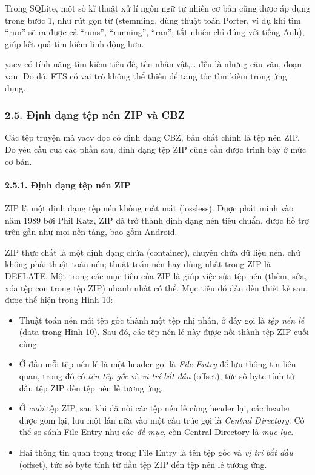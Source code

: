 \documentclass[
]{article}
\begin{document}
Trong SQLite, một số kĩ thuật xử lí ngôn ngữ tự nhiên cơ bản cũng được
áp dụng trong bước 1, như rút gọn từ (stemming, dùng thuật toán Porter,
ví dụ khi tìm ``run'' sẽ ra được cả ``runs'', ``running'', ``ran''; tất
nhiên chỉ đúng với tiếng Anh), giúp kết quả tìm kiếm linh động hơn.

yacv có tính năng tìm kiếm tiêu đề, tên nhân vật,\ldots{} đều là những
câu văn, đoạn văn. Do đó, FTS có vai trò không thể thiếu để tăng tốc tìm
kiếm trong ứng dụng.

\hypertarget{ux111ux1ecbnh-dux1ea1ng-tux1ec7p-nuxe9n-zip-vuxe0-cbz}{%
\subsubsection{\texorpdfstring{2.5. Định dạng tệp nén ZIP và CBZ
}{2.5. Định dạng tệp nén ZIP và CBZ }}\label{ux111ux1ecbnh-dux1ea1ng-tux1ec7p-nuxe9n-zip-vuxe0-cbz}}

Các tệp truyện mà yacv đọc có định dạng CBZ, bản chất chính là tệp nén
ZIP. Do yêu cầu của các phần sau, định dạng tệp ZIP cũng cần được trình
bày ở mức cơ bản.

\hypertarget{ux111ux1ecbnh-dux1ea1ng-tux1ec7p-nuxe9n-zip}{%
\paragraph{\texorpdfstring{2.5.1. Định dạng tệp nén ZIP
}{2.5.1. Định dạng tệp nén ZIP }}\label{ux111ux1ecbnh-dux1ea1ng-tux1ec7p-nuxe9n-zip}}

ZIP là một định dạng tệp nén không mất mát (lossless). Được phát minh
vào năm 1989 bởi Phil Katz, ZIP đã trở thành định dạng nén tiêu chuẩn,
được hỗ trợ trên gần như mọi nền tảng, bao gồm Android.

ZIP thực chất là một định dạng chứa (container), chuyên chứa dữ liệu
nén, chứ không phải thuật toán nén; thuật toán nén hay dùng nhất trong
ZIP là DEFLATE. Một trong các mục tiêu của ZIP là giúp việc sửa tệp nén
(thêm, sửa, xóa tệp con trong tệp ZIP) nhanh nhất có thể. Mục tiêu đó
dẫn đến thiết kế sau, được thể hiện trong Hình 10:

\begin{itemize}
\item
  Thuật toán nén mỗi tệp gốc thành một tệp nhị phân, ở đây gọi là
  \emph{tệp nén lẻ} (data trong Hình 10). Sau đó, các tệp nén lẻ này
  được nối thành tệp ZIP cuối cùng.
\item
  Ở đầu mỗi tệp nén lẻ là một header gọi là \emph{File Entry} để lưu
  thông tin liên quan, trong đó có \emph{tên tệp gốc} và \emph{vị trí
  bắt đầu} (offset), tức số byte tính từ đầu tệp ZIP đến tệp nén lẻ
  tương ứng.
\item
  Ở \emph{cuối} tệp ZIP, sau khi đã nối các tệp nén lẻ cùng header lại,
  các header được gom lại, lưu một lần nữa vào một cấu trúc gọi là
  \emph{Central Directory}. Có thể so sánh File Entry như các \emph{đề
  mục}, còn Central Directory là \emph{mục lục}.
\item
  Hai thông tin quan trọng trong File Entry là tên tệp gốc và \emph{vị
  trí bắt đầu} (offset), tức số byte tính từ đầu tệp ZIP đến tệp nén lẻ
  tương ứng.
\end{itemize}
\end{document}
